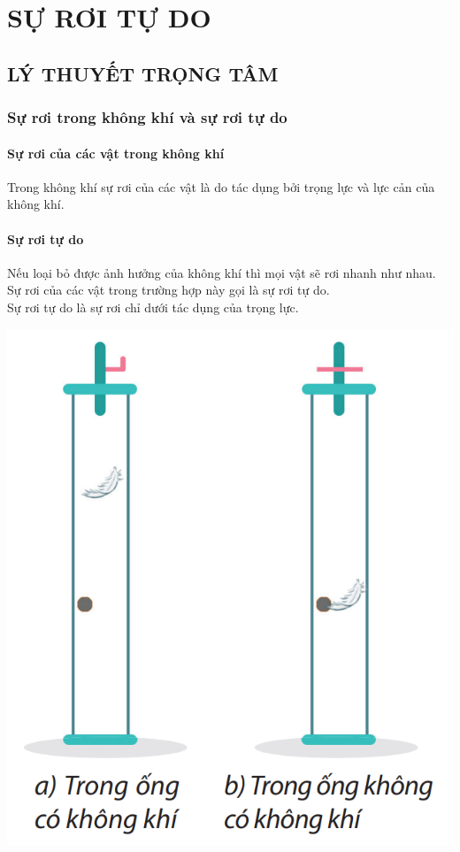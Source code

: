 \section{SỰ RƠI TỰ DO}
\subsection{LÝ THUYẾT TRỌNG TÂM}
\begin{tomtat}
	\subsubsection{Sự rơi trong không khí và sự rơi tự do}
	\paragraph{Sự rơi của các vật trong không khí}
	Trong không khí sự rơi của các vật là do tác dụng bởi trọng lực và lực cản của không khí.
	\paragraph{Sự rơi tự do }
	Nếu loại bỏ được ảnh hưởng của không khí thì mọi vật sẽ rơi nhanh như nhau. Sự rơi của các vật trong trường hợp này gọi là sự rơi tự do.\\
	Sự rơi tự do là sự rơi chỉ dưới tác dụng của trọng lực.
	\begin{center}
		\includegraphics[scale=0.6]{figs/G10Y25B7-1}
	\end{center}

\end{tomtat}

